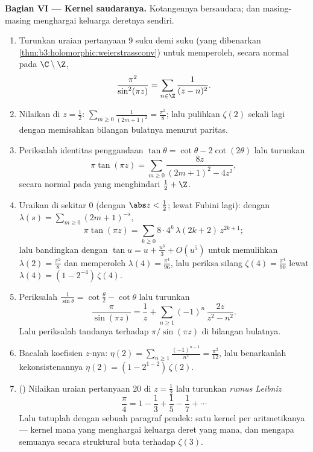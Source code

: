 \begin{problem}
\medskip
\noindent\textbf{Bagian VI --- Kernel saudaranya.} Kotangennya
bersaudara; dan masing-masing menghargai keluarga deretnya sendiri.
\begin{enumerate}[resume]
  \item Turunkan uraian pertanyaan 9 suku demi suku
        (yang dibenarkan
        \cref{thm:b3:holomorphic:weierstrassconv}) untuk
        memperoleh, secara normal pada  $\C\setminus\Z$,
        \[
        \frac{\pi^2}{\sin^2(\pi z)} =
        \sum_{n\in\Z}\frac1{(z - n)^2} .
        \]
  \item Nilaikan di $z = \frac12$:
        $\sum_{m\geq0}\frac1{(2m+1)^2} = \frac{\pi^2}8$;
        lalu pulihkan $\zeta(2)$ sekali lagi dengan memisahkan
        bilangan bulatnya menurut paritas.
  \item Periksalah identitas penggandaan $\tan\theta =
        \cot\theta - 2\cot(2\theta)$ lalu turunkan
        \[
        \pi\tan(\pi z) =
        \sum_{m\geq0}\frac{8z}{(2m+1)^2 - 4z^2} ,
        \]
        secara normal pada  yang menghindari $\frac12 + \Z$.
  \item Uraikan di sekitar $0$ (dengan $\abs z < \frac12$; lewat Fubini
        lagi): dengan $\lambda(s) =
        \sum_{m\geq0}(2m+1)^{-s}$,
        \[
        \pi\tan(\pi z) =
        \sum_{k\geq0}8\cdot4^k\,\lambda(2k+2)\,z^{2k+1} ;
        \]
        lalu bandingkan dengan $\tan u = u + \frac{u^3}3 + O(u^5)$ untuk
        memulihkan $\lambda(2) = \frac{\pi^2}8$ dan memperoleh
        $\lambda(4) = \frac{\pi^4}{96}$, lalu periksa silang
        $\zeta(4) = \frac{\pi^4}{90}$ lewat $\lambda(4) = (1 -
        2^{-4})\,\zeta(4)$.
  \item Periksalah $\frac1{\sin\theta} = \cot\frac\theta2 -
        \cot\theta$ lalu turunkan
        \[
        \frac{\pi}{\sin(\pi z)} = \frac1z +
        \sum_{n\geq1}(-1)^n\,\frac{2z}{z^2 - n^2} .
        \]
        Lalu periksalah tandanya terhadap 
        $\pi/\sin(\pi z)$ di bilangan bulatnya.
  \item Bacalah koefisien $z$-nya: $\eta(2) =
        \sum_{n\geq1}\frac{(-1)^{n-1}}{n^2} =
        \frac{\pi^2}{12}$, lalu benarkanlah kekonsistenannya
        $\eta(2) = (1 - 2^{1-2})\,\zeta(2)$.
  \item () Nilaikan uraian pertanyaan 20 di $z =
        \frac12$ lalu turunkan \emph{rumus Leibniz}
        \[
        \frac\pi4 = 1 - \frac13 + \frac15 - \frac17 +
        \cdots
        \]
        Lalu tutuplah dengan sebuah paragraf pendek: satu kernel per
        aritmetikanya --- kernel mana yang menghargai keluarga deret
        yang mana, dan mengapa semuanya secara struktural buta
        terhadap $\zeta(3)$.


\end{enumerate}
\end{problem}
